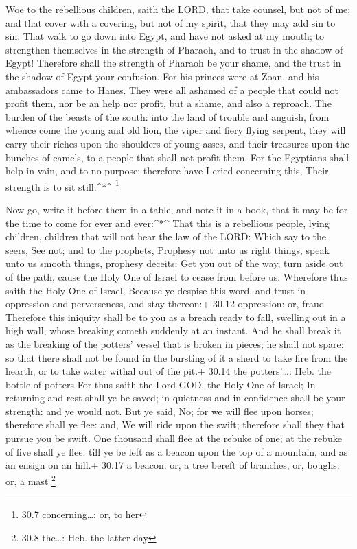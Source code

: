  Woe to the rebellious children, saith the LORD, that take
counsel, but not of me; and that cover with a covering, but not of my
spirit, that they may add sin to sin:  That walk to go down
into Egypt, and have not asked at my mouth; to strengthen themselves in
the strength of Pharaoh, and to trust in the shadow of Egypt!
 Therefore shall the strength of Pharaoh be your shame, and
the trust in the shadow of Egypt your confusion.  For his
princes were at Zoan, and his ambassadors came to Hanes. 
They were all ashamed of a people that could not profit them, nor be an
help nor profit, but a shame, and also a reproach.  The
burden of the beasts of the south: into the land of trouble and anguish,
from whence come the young and old lion, the viper and fiery flying
serpent, they will carry their riches upon the shoulders of young asses,
and their treasures upon the bunches of camels, to a people that shall
not profit them.  For the Egyptians shall help in vain, and
to no purpose: therefore have I cried concerning this, Their strength is
to sit still.\^{}*\^{} \footnote{30.7 concerning\ldots: or, to her}

 Now go, write it before them in a table, and note it in a
book, that it may be for the time to come for ever and ever:\^{}*\^{}
 That this is a rebellious people, lying children, children
that will not hear the law of the LORD:  Which say to the
seers, See not; and to the prophets, Prophesy not unto us right things,
speak unto us smooth things, prophesy deceits:  Get you out
of the way, turn aside out of the path, cause the Holy One of Israel to
cease from before us.  Wherefore thus saith the Holy One of
Israel, Because ye despise this word, and trust in oppression and
perverseness, and stay thereon:+ 30.12 oppression: or, fraud
 Therefore this iniquity shall be to you as a breach ready
to fall, swelling out in a high wall, whose breaking cometh suddenly at
an instant.  And he shall break it as the breaking of the
potters' vessel that is broken in pieces; he shall not spare: so that
there shall not be found in the bursting of it a sherd to take fire from
the hearth, or to take water withal out of the pit.+ 30.14 the
potters'\ldots: Heb. the bottle of potters  For thus saith
the Lord GOD, the Holy One of Israel; In returning and rest shall ye be
saved; in quietness and in confidence shall be your strength: and ye
would not.  But ye said, No; for we will flee upon horses;
therefore shall ye flee: and, We will ride upon the swift; therefore
shall they that pursue you be swift.  One thousand shall
flee at the rebuke of one; at the rebuke of five shall ye flee: till ye
be left as a beacon upon the top of a mountain, and as an ensign on an
hill.+ 30.17 a beacon: or, a tree bereft of branches, or, boughs: or, a
mast \footnote{30.8 the\ldots: Heb. the latter day}

